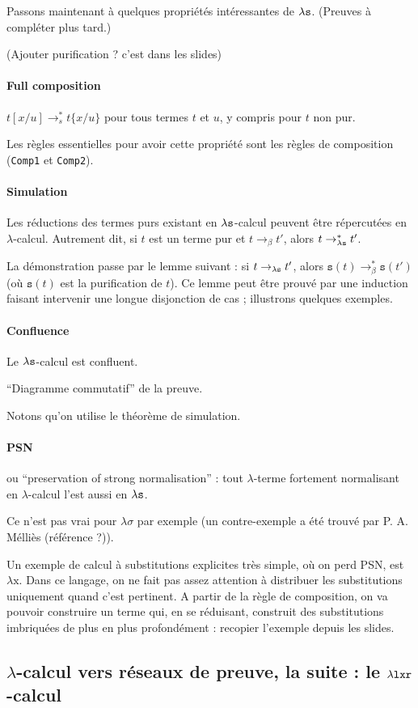 \documentclass[a4paper, 11pt]{article}
\begin{document}
Passons maintenant à quelques propriétés intéressantes de ${\lambda \mathtt{s}}$. (Preuves à compléter plus tard.)

(Ajouter purification ? c'est dans les slides)

\paragraph{Full composition} $t[x/u] \rightarrow_s^* t\{x/u\}$ pour tous termes $t$ et $u$, y compris pour $t$ non pur.

Les règles essentielles pour avoir cette propriété sont les règles de composition (\texttt{Comp1} et \texttt{Comp2}).

\paragraph{Simulation} Les réductions des termes purs existant en ${\lambda \mathtt{s}}$-calcul peuvent être répercutées en $\lambda$-calcul. Autrement dit, si $t$ est un terme pur et $t \rightarrow_\beta t'$, alors $t \rightarrow_{\lambda \mathtt{s}}^* t'$.

La démonstration passe par le lemme suivant : si $t \rightarrow_{\lambda \mathtt{s}} t'$, alors $\mathtt{s}(t) \rightarrow_\beta^* \mathtt{s}(t')$ (où $\mathtt{s}(t)$ est la purification de $t$). Ce lemme peut être prouvé par une induction faisant intervenir une longue disjonction de cas ; illustrons quelques exemples.

\paragraph{Confluence} Le ${\lambda \mathtt{s}}$-calcul est confluent.

\enquote{Diagramme commutatif} de la preuve.

Notons qu'on utilise le théorème de simulation.

\paragraph{PSN} ou \enquote{preservation of strong normalisation} : tout $\lambda$-terme fortement normalisant en $\lambda$-calcul l'est aussi en ${\lambda \mathtt{s}}$.

Ce n'est pas vrai pour $\lambda \sigma$ par exemple (un contre-exemple a été trouvé par P. A. Mélliès (référence ?)).

Un exemple de calcul à substitutions explicites très simple, où on perd PSN, est $\lambda \mathrm{x}$. Dans ce langage, on ne fait pas assez attention à distribuer les substitutions uniquement quand c'est pertinent. A partir de la règle de composition, on va pouvoir construire un terme qui, en se réduisant, construit des substitutions imbriquées de plus en plus profondément : recopier l'exemple depuis les slides.



\subsection{$\lambda$-calcul vers réseaux de preuve, la suite : le ${\lambda \mathtt{l x r}}$-calcul}
\end{document}
